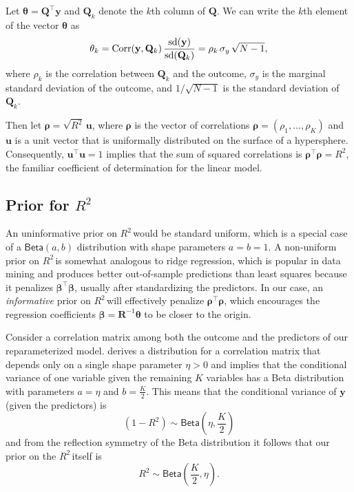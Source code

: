 \documentclass[11pt]{article}
\newcommand{\Rsq}{$R^2\,$}
\newcommand{\boldrho}{\boldsymbol{\rho}}
\newcommand{\boldbeta}{\boldsymbol{\beta}}
\newcommand{\boldtheta}{\boldsymbol{\theta}}
\newcommand{\y}{\mathbf{y}}
\newcommand{\Q}{\mathbf{Q}}
\newcommand{\R}{\mathbf{R}}
\renewcommand{\u}{\mathbf{u}}
\newcommand{\halfK}{\frac{K}{2}}
\newcommand{\Betadist}[2]{\mathsf{Beta}\left(#1,#2\right)}
\begin{document}
Let $\boldtheta = \Q^\top \y$ and $\Q_k$ denote the $k$th column of $\Q$. We can
write the $k$th element of the vector $\boldtheta$ as
$$\theta_k
  = {\rm Corr}(\y, \Q_k) \, \frac{{\rm sd}(\y)}{{\rm sd}(\Q_k)}
  = \rho_k \, \sigma_y \, \sqrt{N - 1},
$$
where $\rho_k$ is the correlation between $\Q_k$ and the outcome, $\sigma_y$ is
the marginal standard deviation of the outcome, and $1/\sqrt{N-1}$ is the
standard deviation of $\Q_k$.

Then let $\boldrho = \sqrt{R^2} \, \u$, where $\boldrho$ is the vector of
correlations $\boldrho = (\rho_1, \dots, \rho_K)$ and $\u$ is a unit vector that is
uniformally distributed on the surface of a hypersphere. Consequently, $\u^\top
\u = 1$ implies that the sum of squared correlations is $\boldrho^\top \boldrho =
R^2$, the familiar coefficient of determination for the linear model.

\subsection{Prior for \Rsq}
\label{subsec:r2prior}

An uninformative prior on \Rsq would be standard uniform, which is a special
case of a $\Betadist{a}{b}$ distribution with shape parameters $a = b = 1$.
A non-uniform prior on \Rsq is somewhat analogous to ridge
regression, which is popular in data mining and produces better out-of-sample
predictions than least squares because it penalizes $\boldbeta^\top \boldbeta$,
usually after standardizing the predictors. In our case, an \emph{informative}
prior on \Rsq will effectively penalize $\boldrho^\top \boldrho$, which
encourages the regression coefficients $\boldbeta = \R^{-1} \boldtheta$
to be closer to the origin.


Consider a correlation matrix among both the outcome and the predictors of our
reparameterized model.  derives a distribution for a correlation
matrix that depends only on a single shape parameter $\eta > 0$ and implies that
the conditional variance of one variable given the remaining $K$ variables has a
Beta distribution with parameters $a = \eta$ and $b = \halfK$. This means that
the conditional variance of $\y$ (given the predictors) is
%
$$(1 - R^2) \sim \Betadist{\eta}{\halfK}$$
%
and from the reflection symmetry of the Beta distribution it follows that our
prior on the \Rsq itself is
%
$$R^2 \sim \Betadist{\halfK}{\eta}.$$
\end{document}
